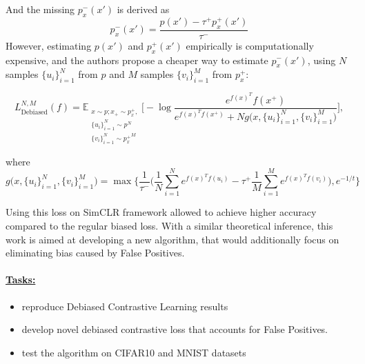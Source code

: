 \documentclass{article}
\begin{document}
And the missing $p^-_x(x')$ is derived as
\begin{equation} \label{eq:5}
p_x^-(x') = \frac{p(x') - \tau^+ p^+_x(x')}{\tau^-}
\end{equation}
However, estimating $p(x')$ and $p^+_x(x')$ empirically is computationally expensive, and the authors propose a cheaper way to estimate $p^-_x(x')$, using $N$ samples $\{u_i\}_{i=1}^N$ from $p$ and $M$ samples $\{v_i\}_{i=1}^M$ from $p_x^+$:

\begin{equation} \label{eq:6}
L_{\text{Debiased}}^{N, M} (f) = \mathbb{E}_{\substack{x \sim p; x_+ \sim p_x^+,\\ \{u_i\}_{i=1}^N \sim p^N \\ \{v_i\}_{i=1}^N \sim {p_x^+}^M}}  \bigg[ -\log \frac{e^{f(x)^T} f(x^+)}{e^{f(x)^T f(x^+)} + N g\big(x, \{u_i\}_{i=1}^N, \{v_i\}_{i=1}^M\big)} \bigg],
\end{equation}

where
\begin{equation}
g\big(x, \{u_i\}_{i=1}^N, \{v_i\}_{i=1}^M\big) = \max \bigg\{ \frac{1}{\tau^-}\bigg(\frac{1}{N} \sum \limits_{i=1}^N e^{f(x)^T f(u_i)} - \tau^+ \frac{1}{M} \sum \limits_{i=1}^M e^{f(x)^T f(v_i)}\bigg), e^{-1/t}\bigg\}
\end{equation}

Using this loss on SimCLR framework allowed to achieve higher accuracy compared to the regular biased loss. With a similar theoretical inference, this work is aimed at developing a new algorithm, that would additionally focus on eliminating bias caused by False Positives.

\paragraph{\underline{Tasks:}} 
\begin{itemize}
  \item reproduce Debiased Contrastive Learning results
  \item develop novel debiased contrastive loss that accounts for False Positives.
  \item test the algorithm on CIFAR10 and MNIST datasets
\end{itemize}
\end{document}
